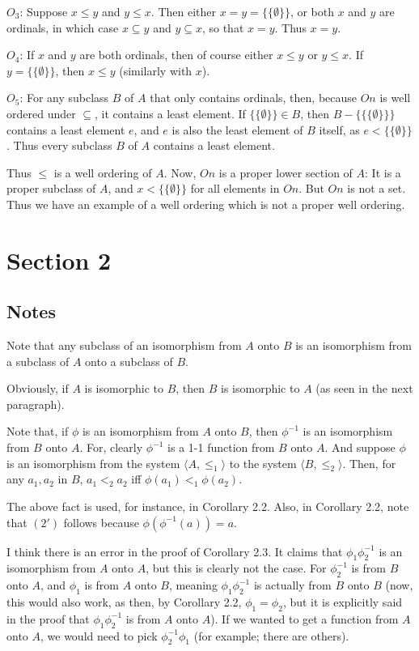 \documentclass{article}
\theoremstyle{definition}
\begin{document}
$O_3$: Suppose $x\le y$ and $y\le x$. Then either $x=y=\{\{\emptyset\}\}$, or both $x$ and $y$ are ordinals, in which case 
$x\subseteq y$ and $y\subseteq x$, so that $x=y$. Thus $x=y$.

$O_4$: If $x$ and $y$ are both ordinals, then of course either $x\le y$ or $y\le x$. If $y=\{\{\emptyset\}\}$, then $x\le y$ (similarly with $x$).

$O_5$: For any subclass $B$ of $A$ that only contains ordinals, then, because $On$ is well ordered under $\subseteq$, it contains a least element. 
If $\{\{\emptyset\}\}\in B$, then $B-\{\{\{\emptyset\}\}\}$ contains a least element $e$, and $e$ is also the least element of $B$ itself, as 
$e<\{\{\emptyset\}\}$. Thus every subclass $B$ of $A$ contains a least element.

Thus $\le$ is a well ordering of $A$. Now, $On$ is a proper lower section of $A$: It is a proper subclass of $A$, and 
$x<\{\{\emptyset\}\}$ for all elements in $On$. But $On$ is not a set. Thus we have an example of a well ordering which 
is not a proper well ordering.

\section*{Section 2}

\subsection*{Notes}
Note that any subclass of an isomorphism from $A$ onto $B$ is an isomorphism from a subclass of $A$ onto a
subclass of $B$.

Obviously, if $A$ is isomorphic to $B$, then $B$ is isomorphic to $A$ (as seen in the next paragraph).

Note that, if $\phi$ is an isomorphism from $A$ onto $B$, then $\phi^{-1}$ is an isomorphism from $B$ onto $A$. For, clearly 
$\phi^{-1}$ is a 1-1 function from $B$ onto $A$. And suppose $\phi$ is an isomorphism from the system $\langle A,\le_1\rangle$ to 
the system $\langle B,\le_2\rangle$. Then, for any $a_1,a_2$ in $B$, $a_1<_2a_2$ iff $\phi(a_1)<_1\phi(a_2)$.

The above fact is used, for instance, in Corollary 2.2. Also, in Corollary 2.2, note that $(2')$ follows 
because $\phi(\phi^{-1}(a))=a$. 

I think there is an error in the proof of Corollary 2.3. It claims that $\phi_1\phi_2^{-1}$ is an isomorphism from $A$ onto $A$, but this 
is clearly not the case. For $\phi_2^{-1}$ is from $B$ onto $A$, and $\phi_1$ is from $A$ onto $B$, meaning 
$\phi_1\phi_2^{-1}$ is actually from $B$ onto $B$ (now, this would also work, as then, by Corollary 2.2, $\phi_1=\phi_2$, but 
it is explicitly said in the proof that $\phi_1\phi_2^{-1}$ is from $A$ onto $A$). If we wanted to get a function from $A$ onto 
$A$, we would need to pick $\phi_2^{-1}\phi_1$ (for example; there are others).
\end{document}
